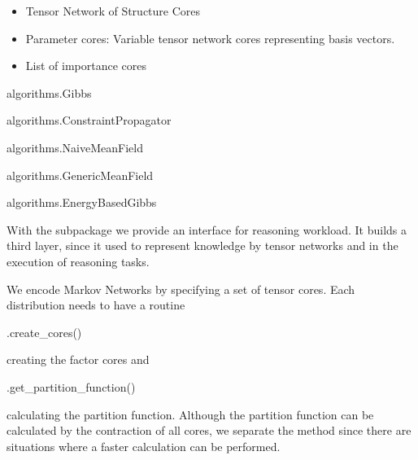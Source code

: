 \begin{itemize}
	\item Tensor Network of Structure Cores
	\item Parameter cores: Variable tensor network cores representing basis vectors.
	\item List of importance cores
\end{itemize}

\begin{centeredcode}
	algorithms.Gibbs
\end{centeredcode}



\begin{centeredcode}
	algorithms.ConstraintPropagator
\end{centeredcode}



\begin{centeredcode}
	algorithms.NaiveMeanField
\end{centeredcode}

\begin{centeredcode}
	algorithms.GenericMeanField
\end{centeredcode}

\begin{centeredcode}
	algorithms.EnergyBasedGibbs
\end{centeredcode}



With the \spknowledge subpackage we provide an interface for reasoning workload.
It builds a third layer, since it used \spencoding to represent knowledge by tensor networks and \spalgorithms in the execution of reasoning tasks.


We encode Markov Networks by specifying a set of tensor cores.
Each distribution needs to have a routine
\begin{centeredcode}
	.create\_cores()
\end{centeredcode}
creating the factor cores and 
\begin{centeredcode}
	.get\_partition\_function()
\end{centeredcode}
calculating the partition function.
Although the partition function can be calculated by the contraction of all cores, we separate the method since there are situations where a faster calculation can be performed.


